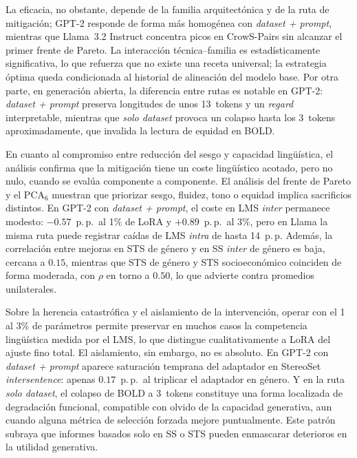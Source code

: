 \documentclass[12pt,a4paper]{report}
\newcommand{\PCAsix}{\ensuremath{\mathrm{PCA}_6}}
\begin{document}
La eficacia, no obstante, depende de la familia arquitectónica y de la ruta de mitigación; GPT-2 responde de forma más homogénea con \textit{dataset + prompt}, mientras que Llama~3.2 Instruct concentra picos en CrowS-Pairs sin alcanzar el primer frente de Pareto. La interacción técnica--familia es estadísticamente significativa, lo que refuerza que no existe una receta universal; la estrategia óptima queda condicionada al historial de alineación del modelo base. Por otra parte, en generación abierta, la diferencia entre rutas es notable en GPT-2: \textit{dataset + prompt} preserva longitudes de unos 13~tokens y un \textit{regard} interpretable, mientras que \textit{solo dataset} provoca un colapso hasta los 3~tokens aproximadamente, que invalida la lectura de equidad en BOLD.

En cuanto al compromiso entre reducción del sesgo y capacidad lingüística, el análisis confirma que la mitigación tiene un coste lingüístico acotado, pero no nulo, cuando se evalúa componente a componente. El análisis del frente de Pareto y el \PCAsix{} muestran que priorizar sesgo, fluidez, tono o equidad implica sacrificios distintos. En GPT-2 con \textit{dataset + prompt}, el coste en LMS \textit{inter} permanece modesto: $-0.57$~p.\,p.\ al 1\% de LoRA y $+0.89$~p.\,p.\ al 3\%, pero en Llama la misma ruta puede registrar caídas de LMS \textit{intra} de hasta 14~p.\,p. Además, la correlación entre mejoras en STS de género y en SS \textit{inter} de género es baja, cercana a $0.15$, mientras que STS de género y STS socioeconómico coinciden de forma moderada, con $\rho$ en torno a $0.50$, lo que advierte contra promedios unilaterales.

Sobre la herencia catastrófica y el aislamiento de la intervención, operar con el 1 al 3\% de parámetros permite preservar en muchos casos la competencia lingüística medida por el LMS, lo que distingue cualitativamente a LoRA del ajuste fino total. El aislamiento, sin embargo, no es absoluto. En GPT-2 con \textit{dataset + prompt} aparece saturación temprana del adaptador en StereoSet \textit{intersentence}: apenas $0.17$~p.\,p.\ al triplicar el adaptador en género. Y en la ruta \textit{solo dataset}, el colapso de BOLD a 3~tokens constituye una forma localizada de degradación funcional, compatible con olvido de la capacidad generativa, aun cuando alguna métrica de selección forzada mejore puntualmente. Este patrón subraya que informes basados solo en SS o STS pueden enmascarar deterioros en la utilidad generativa.
\end{document}
